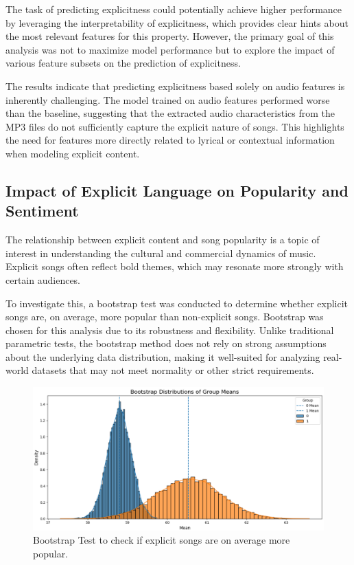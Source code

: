 The task of predicting explicitness could potentially achieve higher
performance by leveraging the interpretability of explicitness, which provides
clear hints about the most relevant features for this property. However, the
primary goal of this analysis was not to maximize model performance but to
explore the impact of various feature subsets on the prediction of
explicitness.

The results indicate that predicting explicitness based solely on audio
features is inherently challenging. The model trained on audio features
performed worse than the baseline, suggesting that the extracted audio
characteristics from the MP3 files do not sufficiently capture the explicit
nature of songs. This highlights the need for features more directly related to
lyrical or contextual information when modeling explicit content.



\subsection{Impact of Explicit Language on Popularity and Sentiment}
\label{sec:explicitmorepopular}

The relationship between explicit content and song popularity is a topic of
interest in understanding the cultural and commercial dynamics of music.
Explicit songs often reflect bold themes, which may resonate more strongly with
certain audiences. 

To investigate this, a bootstrap test was conducted to determine whether
explicit songs are, on average, more popular than non-explicit songs. Bootstrap
was chosen for this analysis due to its robustness and flexibility. Unlike
traditional parametric tests, the bootstrap method does not rely on strong
assumptions about the underlying data distribution, making it well-suited for
analyzing real-world datasets that may not meet normality or other strict
requirements.


\begin{center}
\begin{figure}[H]
  \centering
  \includegraphics[width=5in]{img/explicitness_bootstrap.png}
  \caption{Bootstrap Test to check if explicit songs are on average more
  popular.}
  \label{Figure:fig_bh}
\end{figure}
\end{center}



